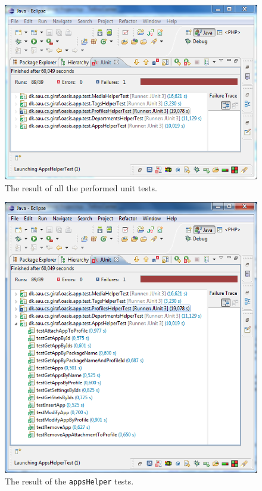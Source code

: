 \begin{figure}[htbp]
	\centering
		\includegraphics[width=\textwidth]{Images/unit_testing/all_tests.PNG}
	\caption{The result of all the performed unit tests.}
	\label{fig:all_tests}
\end{figure}

\begin{figure}[htbp]
	\centering
		\includegraphics[width=\textwidth]{Images/unit_testing/app_helper_tests.PNG}
	\caption{The result of the \texttt{appsHelper} tests.}
	\label{fig:app_helper_tests}
\end{figure}

